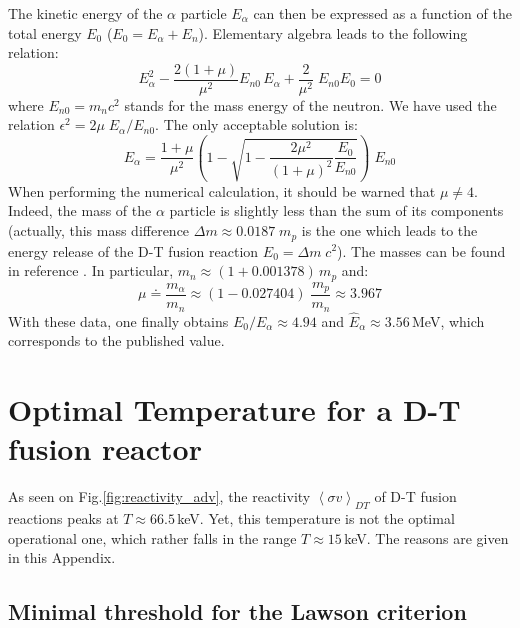 The kinetic energy of the $\alpha$ particle $E_\alpha$ can then be expressed as a function of the total energy $E_0$ ($E_0 =E_\alpha + E_n$). Elementary algebra leads to the following relation:
\begin{equation}
    E_\alpha^2 - \frac{2(1+\mu)}{\mu^2}E_{n0}\, E_\alpha + \frac{2}{\mu^2}\; E_{n0}E_0 = 0
\end{equation}
where $E_{n0} = m_nc^2$ stands for the mass energy of the neutron. We have used the relation $\epsilon^2 = 2\mu\; E_\alpha/E_{n0}$. The only acceptable solution is:
\begin{equation}
    E_\alpha = \frac{1+\mu}{\mu^2}
    \left( 1 - \sqrt{1-\frac{2\mu^2}{(1+\mu)^2}\frac{E_0}{E_{n0}}}\right)\; E_{n0}
\end{equation}
When performing the numerical calculation, it should be warned that $\mu\neq 4$. 
Indeed, the mass of the $\alpha$ particle is slightly less than the sum of its components (actually, this mass difference $\Delta m \approx 0.0187\; m_p$ is the one which leads to the energy release of the D-T fusion reaction $E_0 = \Delta m\;c^2$). The masses can be found in reference . In particular, $m_n \approx (1+0.001378)\, m_p$ and:
$$
    \mu \doteq \frac{m_\alpha}{m_n} \approx (1-0.027404)\; \frac{m_p}{m_n} \approx 3.967
$$
With these data, one finally obtains $E_0/E_\alpha \approx 4.94$ and $\hat E_\alpha \approx 3.56\,$MeV, which corresponds to the published value.  

\chapter{Optimal Temperature for a D-T fusion reactor}
\label{appendix:temperature}

As seen on Fig.\ref{fig:reactivity_adv}, the reactivity $\left< \sigma v \right>_{DT}$ of D-T fusion reactions peaks at $T\approx 66.5\,$keV. Yet, this temperature is not the optimal operational one, which rather falls in the range $T\approx 15\,$keV. The reasons are given in this Appendix.


\section{Minimal threshold for the Lawson criterion}

